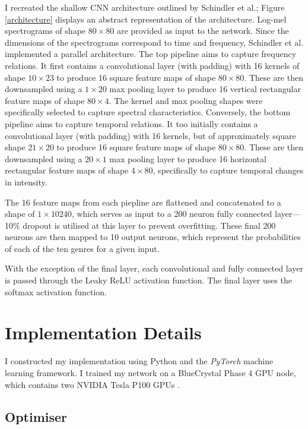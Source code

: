 \documentclass[conference]{IEEEtran}
\begin{document}
I recreated the shallow CNN architecture outlined by Schindler et al.; Figure \ref{architecture} displays an abstract representation of the architecture.
Log-mel spectrograms of shape $80\times80$ are provided as input to the network.
Since the dimensions of the spectrograms correspond to time and frequency, Schindler et al. implemented a parallel architecture.
The top pipeline aims to capture frequency relations.
It first contains a convolutional layer (with padding) with 16 kernels of shape $10\times23$ to produce 16 square feature maps of shape $80\times80$.
These are then downsampled using a $1\times20$ max pooling layer to produce 16 vertical rectangular feature maps of shape $80\times4$.
The kernel and max pooling shapes were specifically selected to capture spectral characteristics.
Conversely, the bottom pipeline aims to capture temporal relations.
It too initially contains a convolutional layer (with padding) with 16 kernels, but of approximately square shape $21\times20$ to produce 16 square feature maps of shape $80\times80$.
These are then downsampled using a $20\times1$ max pooling layer to produce 16 horizontal rectangular feature maps of shape $4\times80$, specifically to capture temporal changes in intensity.

The 16 feature maps from each piepline are flattened and concatenated to a shape of $1\times10240$, which serves as input to a 200 neuron fully connected layer---10\% dropout is utilised at this layer to prevent overfitting.
These final 200 neurons are then mapped to 10 output neurons, which represent the probabilities of each of the ten genres for a given input.

With the exception of the final layer, each convolutional and fully connected layer is passed through the Leaky ReLU activation function.
The final layer uses the softmax activation function.

\section{Implementation Details}

I constructed my implementation using Python and the \textit{PyTorch} \cite{PyTorch} machine learning framework.
I trained my network on a BlueCrystal Phase 4 GPU node, which contains two NVIDIA Tesla P100 GPUs \cite{bc4}.

\subsection{Optimiser}
\end{document}
